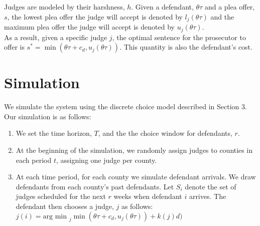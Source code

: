 \documentclass[11pt]{article}
\begin{document}
Judges are modeled by their harshness, $h$. Given a defendant, $\theta \tau$ and a plea offer, $s$, the lowest plea offer the judge will accept is denoted by $l_j(\theta \tau)$ and the maximum plea offer the judge will accept is denoted by $u_j(\theta \tau)$.\\

As a result, given a specific judge $j$, the optimal sentence for the prosecutor to offer is $s^* = \min(\theta \tau + c_d,u_j(\theta \tau))$. This quantity is also the defendant's cost.

\section{Simulation}
  We simulate the system using the discrete choice model described in Section 3. Our simulation is as follows:
  \begin{enumerate}
    \item We set the time horizon, $T$, and the the choice window for defendants, $r$.
    \item At the beginning of the simulation, we randomly assign judges to counties in each period $t$, assigning one judge per county.
    \item At each time period, for each county we simulate defendant arrivals. We draw defendants from each county's past defendants. Let $S_i$ denote the set of judges scheduled for the next $r$ weeks when defendant $i$ arrives. The defendant then chooses a judge, $j$ as follows: $j(i) = \text{arg min }_j \min(\theta \tau + c_d, u_j(\theta \tau)) + k(j)d)$
  \end{enumerate}
\end{document}

